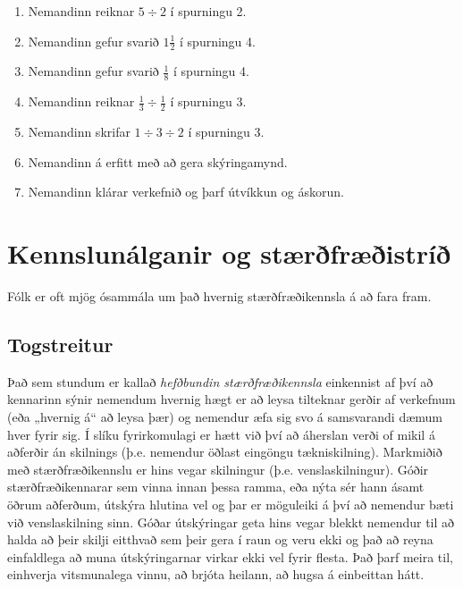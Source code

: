 \documentclass[
  icelandic,
]{book}
\providecommand{\tightlist}{%
  \setlength{\itemsep}{0pt}\setlength{\parskip}{0pt}}
\begin{document}
\begin{enumerate}
\def\labelenumi{\arabic{enumi}.}
\tightlist
\item
  Nemandinn reiknar \(5 \div 2\) í spurningu 2.
\item
  Nemandinn gefur svarið \(1 \frac{1}{2}\) í spurningu 4.
\item
  Nemandinn gefur svarið \(\frac{1}{8}\) í spurningu 4.
\item
  Nemandinn reiknar \(\frac{1}{3} \div \frac{1}{2}\) í spurningu 3.
\item
  Nemandinn skrifar \(1 \div 3 \div 2\) í spurningu 3.
\item
  Nemandinn á erfitt með að gera skýringamynd.
\item
  Nemandinn klárar verkefnið og þarf útvíkkun og áskorun.
\end{enumerate}

\chapter{Kennslunálganir og stærðfræðistríð}\label{kennslunuxe1lganir-og-stuxe6ruxf0fruxe6uxf0istruxeduxf0}

Fólk er oft mjög ósammála um það hvernig stærðfræðikennsla á að fara fram.

\section{Togstreitur}\label{togstreitur}

Það sem stundum er kallað \emph{hefðbundin stærðfræðikennsla} einkennist af því að kennarinn sýnir nemendum hvernig hægt er að leysa tilteknar gerðir af verkefnum (eða „hvernig á`` að leysa þær) og nemendur æfa sig svo á samsvarandi dæmum hver fyrir sig. Í slíku fyrirkomulagi er hætt við því að áherslan verði of mikil á aðferðir án skilnings (þ.e. nemendur öðlast eingöngu tækniskilning). Markmiðið með stærðfræðikennslu er hins vegar skilningur (þ.e. venslaskilningur). Góðir stærðfræðikennarar sem vinna innan þessa ramma, eða nýta sér hann ásamt öðrum aðferðum, útskýra hlutina vel og þar er möguleiki á því að nemendur bæti við venslaskilning sinn. Góðar útskýringar geta hins vegar blekkt nemendur til að halda að þeir skilji eitthvað sem þeir gera í raun og veru ekki og það að reyna einfaldlega að muna útskýringarnar virkar ekki vel fyrir flesta. Það þarf meira til, einhverja vitsmunalega vinnu, að brjóta heilann, að hugsa á einbeittan hátt.
\end{document}
